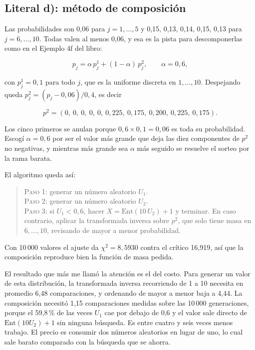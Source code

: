 \documentclass[11pt,letterpaper]{article}
\begin{document}
\subsection{Literal d): método de composición}

Las probabilidades son 0,06 para $j = 1,\dots,5$ y 0,15, 0,13, 0,14, 0,15, 0,13 para $j = 6,\dots,10$.
Todas valen al menos 0,06, y esa es la pista para descomponerlas como en el Ejemplo 4f del libro:

\[
p_j = \alpha\,p_j^{1} + (1-\alpha)\,p_j^{2}, \qquad \alpha = 0{,}6,
\]

con $p_j^{1} = 0{,}1$ para todo $j$, que es la uniforme discreta en $1,\dots,10$. Despejando queda
$p_j^{2} = (p_j - 0{,}06)/0{,}4$, es decir

\[
p^{2} = (0,\ 0,\ 0,\ 0,\ 0,\ 0{,}225,\ 0{,}175,\ 0{,}200,\ 0{,}225,\ 0{,}175).
\]

Los cinco primeros se anulan porque $0{,}6 \times 0{,}1 = 0{,}06$ es toda su probabilidad. Escogí
$\alpha = 0{,}6$ por ser el valor más grande que deja las diez componentes de $p^{2}$ no negativas, y
mientras más grande sea $\alpha$ más seguido se resuelve el sorteo por la rama barata.

El algoritmo queda así:

\begin{quote}
\textsc{Paso 1:} generar un número aleatorio $U_1$.\\
\textsc{Paso 2:} generar un número aleatorio $U_2$.\\
\textsc{Paso 3:} si $U_1 < 0{,}6$, hacer $X = \mathrm{Ent}(10\,U_2) + 1$ y terminar. En caso
contrario, aplicar la transformada inversa sobre $p^{2}$, que solo tiene masa en $6,\dots,10$,
revisando de mayor a menor probabilidad.
\end{quote}



Con 10\,000 valores el ajuste da $\chi^2 = 8{,}5930$ contra el crítico 16,919, así que la
composición reproduce bien la función de masa pedida.

El resultado que más me llamó la atención es el del costo. Para generar un valor de esta
distribución, la transformada inversa recorriendo de 1 a 10 necesita en promedio 6,48 comparaciones,
y ordenando de mayor a menor baja a 4,44. La composición necesitó 1,15 comparaciones medidas sobre
las 10\,000 generaciones, porque el 59,8\,\% de las veces $U_1$ cae por debajo de 0,6 y el valor sale
directo de $\mathrm{Ent}(10U_2)+1$ sin ninguna búsqueda. Es entre cuatro y seis veces menos trabajo.
El precio es consumir dos números aleatorios en lugar de uno, lo cual sale barato comparado con la
búsqueda que se ahorra.
\end{document}
